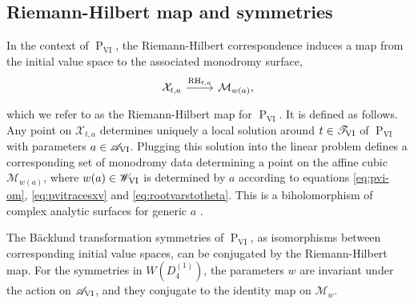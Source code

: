 \documentclass[a4paper,reqno]{amsart}
\numberwithin{equation}{section}
\newcommand{\pain}[1]{\operatorname{P}_{\mathrm{#1}}}
\numberwithin{equation}{section}
\begin{document}
\subsection{Riemann-Hilbert map and symmetries} \label{subsec:pvi:riemannhilbertmapandsymmetries}

In the context of $\pain{VI}$, the Riemann-Hilbert correspondence induces a map from the initial value space to the associated monodromy surface,
\begin{equation*}
    \begin{tikzcd}
        \mathcal{X}_{t,a} \arrow[r,"\operatorname{RH}_{t,a}"] & \mathcal{M}_{w(a)},
    \end{tikzcd}
\end{equation*}
which we refer to as the Riemann-Hilbert map for $\pain{VI}$. It is defined as follows. 
Any point on $\mathcal{X}_{t,a}$ determines uniquely a local solution around $t\in \mathscr{T}_{\rm{VI}}$ of $\pain{VI}$ with parameters $a\in\mathscr{A}_{\rm{VI}}$. Plugging this solution into the linear problem defines a corresponding set of monodromy data determining a point on the affine cubic $\mathcal{M}_{w(a)}$, where $w(a) \in \mathscr{W}_{\rm VI}$ is determined by $a$ according to equations \eqref{eq:pvi-om}, \eqref{eq:pvitracesxv} and  \eqref{eq:rootvarstotheta}.
This is a biholomorphism of complex analytic surfaces for generic $a$ \cite{inabaiwasakisaito}.












The B\"acklund transformation symmetries of $\pain{VI}$, as isomorphisms between corresponding initial value spaces, can be conjugated by the Riemann-Hilbert map. 
For the symmetries in $W(D_4^{(1)})$, the parameters $w$ are invariant under the action on $\mathscr{A}_{\rm VI}$, and they conjugate to the identity map on $\mathcal{M}_{w}$.
\end{document}
